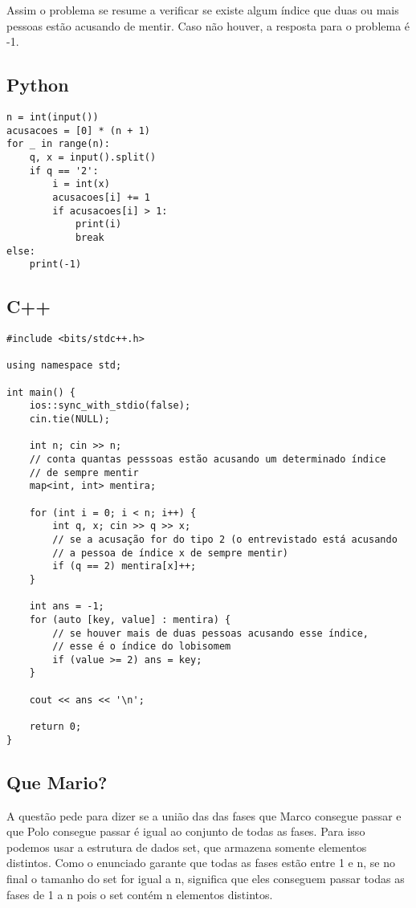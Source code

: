 \documentclass[11pt,fancychapters]{article}
\begin{document}
Assim o problema se resume a verificar se existe algum índice que duas ou mais pessoas estão acusando de mentir. Caso não houver, a resposta para o problema é -1.\\
\subsection{Python}
\begin{lstlisting}[style=c++]
n = int(input())
acusacoes = [0] * (n + 1)
for _ in range(n):
    q, x = input().split()
    if q == '2':
        i = int(x)
        acusacoes[i] += 1
        if acusacoes[i] > 1:
            print(i)
            break
else: 
    print(-1)
\end{lstlisting}
\newpage
\subsection{C++}
\begin{lstlisting}[style=c++]
#include <bits/stdc++.h>
 
using namespace std;
 
int main() {
    ios::sync_with_stdio(false);
    cin.tie(NULL);
    
    int n; cin >> n;
    // conta quantas pesssoas estão acusando um determinado índice
    // de sempre mentir
    map<int, int> mentira;
    
    for (int i = 0; i < n; i++) {
        int q, x; cin >> q >> x;
        // se a acusação for do tipo 2 (o entrevistado está acusando
        // a pessoa de índice x de sempre mentir)
        if (q == 2) mentira[x]++;
    }
    
    int ans = -1;
    for (auto [key, value] : mentira) {
        // se houver mais de duas pessoas acusando esse índice,
        // esse é o índice do lobisomem
        if (value >= 2) ans = key;
    }
    
    cout << ans << '\n';
 
    return 0;
}
\end{lstlisting}
\newpage
\begin{center}\section{Que Mario?}\end{center}
\noindent
A questão pede para dizer se a união das das fases que Marco consegue passar e que Polo consegue passar é igual ao conjunto de todas as fases. Para isso podemos usar a estrutura de dados set, que armazena somente elementos distintos. Como o enunciado garante que todas as fases estão entre 1 e n, se no final o tamanho do set for igual a n, significa que eles conseguem passar todas as fases de 1 a n pois o set contém n elementos distintos. \\
\end{document}
